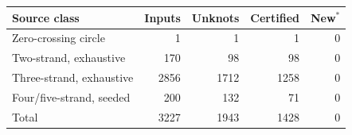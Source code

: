 \begin{tabular}{@{}lrrrr@{}}
\toprule
Source class & Inputs & Unknots & Certified & New$^*$ \\
\midrule
Zero-crossing circle & 1 & 1 & 1 & 0 \\
Two-strand, exhaustive & 170 & 98 & 98 & 0 \\
Three-strand, exhaustive & 2856 & 1712 & 1258 & 0 \\
Four/five-strand, seeded & 200 & 132 & 71 & 0 \\
Total & 3227 & 1943 & 1428 & 0 \\
\bottomrule
\end{tabular}
